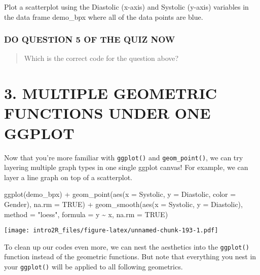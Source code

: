 \documentclass[
]{book}
\newenvironment{Shaded}{\begin{snugshade}}{\end{snugshade}}
\newcommand{\AttributeTok}[1]{\textcolor[rgb]{0.77,0.63,0.00}{#1}}
\newcommand{\ConstantTok}[1]{\textcolor[rgb]{0.00,0.00,0.00}{#1}}
\newcommand{\FunctionTok}[1]{\textcolor[rgb]{0.00,0.00,0.00}{#1}}
\newcommand{\NormalTok}[1]{#1}
\newcommand{\SpecialCharTok}[1]{\textcolor[rgb]{0.00,0.00,0.00}{#1}}
\newcommand{\StringTok}[1]{\textcolor[rgb]{0.31,0.60,0.02}{#1}}
\begin{document}
Plot a scatterplot using the Diastolic (x-axis) and Systolic (y-axis) variables in the data frame demo\_bpx where all of the data points are blue.

\hypertarget{do-question-5-of-the-quiz-now-2}{%
\subsubsection{DO QUESTION 5 OF THE QUIZ NOW}\label{do-question-5-of-the-quiz-now-2}}

\begin{quote}
Which is the correct code for the question above?
\end{quote}

\hypertarget{multiple-geometric-functions-under-one-ggplot}{%
\section{3. MULTIPLE GEOMETRIC FUNCTIONS UNDER ONE GGPLOT}\label{multiple-geometric-functions-under-one-ggplot}}

Now that you're more familiar with \texttt{ggplot()} and \texttt{geom\_point()}, we can try layering multiple graph types in one single ggplot canvas! For example, we can layer a line graph on top of a scatterplot.

\begin{Shaded}
\begin{Highlighting}[]
\FunctionTok{ggplot}\NormalTok{(demo\_bpx) }\SpecialCharTok{+}
  \FunctionTok{geom\_point}\NormalTok{(}\FunctionTok{aes}\NormalTok{(}\AttributeTok{x =}\NormalTok{ Systolic, }\AttributeTok{y =}\NormalTok{ Diastolic, }\AttributeTok{color =}\NormalTok{ Gender), }
             \AttributeTok{na.rm =} \ConstantTok{TRUE}\NormalTok{) }\SpecialCharTok{+} 
  \FunctionTok{geom\_smooth}\NormalTok{(}\FunctionTok{aes}\NormalTok{(}\AttributeTok{x =}\NormalTok{ Systolic, }\AttributeTok{y =}\NormalTok{ Diastolic), }
              \AttributeTok{method =} \StringTok{"loess"}\NormalTok{, }
              \AttributeTok{formula =}\NormalTok{ y }\SpecialCharTok{\textasciitilde{}}\NormalTok{ x, }
              \AttributeTok{na.rm =} \ConstantTok{TRUE}\NormalTok{)}
\end{Highlighting}
\end{Shaded}

\texttt{[image: intro2R\_files/figure-latex/unnamed-chunk-193-1.pdf]}

To clean up our codes even more, we can nest the aesthetics into the \texttt{ggplot()} function instead of the geometric functions. But note that everything you nest in your \texttt{ggplot()} will be applied to all following geometrics.
\end{document}
